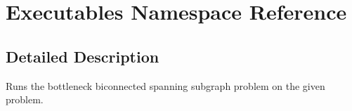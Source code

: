 \hypertarget{namespace_executables}{
\section{Executables Namespace Reference}
\label{namespace_executables}
}




\subsection{Detailed Description}
Runs the bottleneck biconnected spanning subgraph problem on the given problem. 